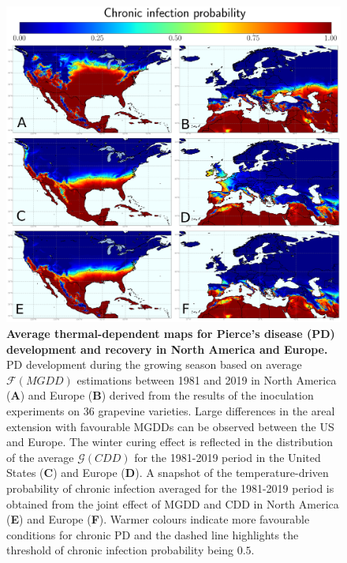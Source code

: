     \begin{figure}[H]
        \centering
        \includegraphics[width=\textwidth]{Figures/Fig1_new.pdf}
        \caption{\textbf{Average thermal-dependent maps for Pierce's disease
                (PD)
                development and recovery in North America and Europe.} PD
            development during
            the growing season based on average $\mathcal{F}(MGDD)$ estimations
            between
            1981 and 2019 in North America (\textbf{A}) and Europe (\textbf{B})
            derived
            from the results of the inoculation experiments on 36 grapevine
            varieties.
            Large differences in the areal extension with favourable MGDDs can
            be observed
            between the US and Europe. The winter curing effect is reflected in
            the
            distribution of the average $\mathcal{G}(CDD)$ for the 1981-2019
            period in the
            United States (\textbf{C}) and Europe (\textbf{D}). A snapshot of
            the
            temperature-driven probability of chronic infection averaged for
            the 1981-2019
            period is obtained from the joint effect of MGDD and CDD in North
            America
            (\textbf{E}) and Europe (\textbf{F}). Warmer colours indicate more
            favourable
            conditions for chronic PD and the dashed line highlights the
            threshold of
            chronic infection probability being $0.5$.}
        \label{fig2}
    \end{figure}

